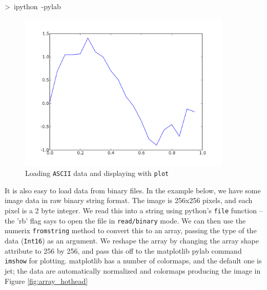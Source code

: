 \begin{lyxcode}
>~ipython~-pylab

%
\begin{figure}
\begin{centering}
\includegraphics[width=4in]{fig/load_ascii}
\par\end{centering}

\caption{\label{fig:load_ascii}Loading \texttt{ASCII} data and displaying
with \texttt{plot}}

\end{figure}

\end{lyxcode}




It is also easy to load data from binary files. In the example below,
we have some image data in raw binary string format. The image is
256x256 pixels, and each pixel is a 2 byte integer. We read this into
a string using python's \texttt{file} function -- the 'rb' flag says
to open the file in \texttt{read/binary} mode. We can then use the
numerix \texttt{fromstring} method to convert this to an array, passing
the type of the data (\texttt{Int16}) as an argument. We reshape the
array by changing the array shape attribute to 256 by 256, and pass
this off to the matplotlib pylab command \texttt{imshow} for plotting.
matplotlib has a number of colormaps, and the default one is jet;
the data are automatically normalized and colormaps producing the
image in Figure \ref{fig:array_hothead}





